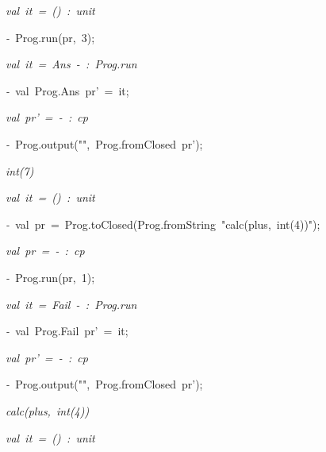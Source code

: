 \begin{list}{}
\item[]\textsl{val\ it\ =\ ()\ :\ unit}
\item[]\textsl{-\ }Prog.run(pr,\ 3);
\item[]\textsl{val\ it\ =\ Ans\ -\ :\ Prog.run}
\item[]\textsl{-\ }val\ Prog.Ans\ pr'\ =\ it;
\item[]\textsl{val\ pr'\ =\ -\ :\ cp}
\item[]\textsl{-\ }Prog.output("",\ Prog.fromClosed\ pr');
\item[]\textsl{int(7)}
\item[]\textsl{val\ it\ =\ ()\ :\ unit}
\item[]\textsl{-\ }val\ pr\ =\ Prog.toClosed(Prog.fromString\ "calc(plus,\ int(4))");
\item[]\textsl{val\ pr\ =\ -\ :\ cp}
\item[]\textsl{-\ }Prog.run(pr,\ 1);
\item[]\textsl{val\ it\ =\ Fail\ -\ :\ Prog.run}
\item[]\textsl{-\ }val\ Prog.Fail\ pr'\ =\ it;
\item[]\textsl{val\ pr'\ =\ -\ :\ cp}
\item[]\textsl{-\ }Prog.output("",\ Prog.fromClosed\ pr');
\item[]\textsl{calc(plus,\ int(4))}
\item[]\textsl{val\ it\ =\ ()\ :\ unit}
\end{list}
